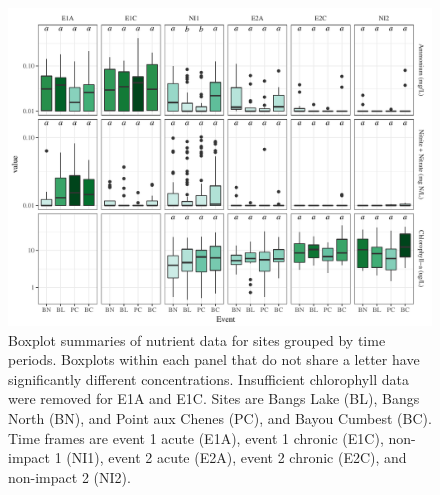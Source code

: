 \documentclass[letterpaper,12pt]{article}\usepackage[]{graphicx}\usepackage[]{color}
\makeatletter
\def\maxwidth{ %
  \ifdim\Gin@nat@width>\linewidth
    \linewidth
  \else
    \Gin@nat@width
  \fi
}
\makeatother
\begin{document}
\begin{figure}[!ht]

{\centering \includegraphics[width=\maxwidth]{figs/FigS2} 

}

\caption[Boxplot summaries of nutrient data for sites grouped by time periods]{Boxplot summaries of nutrient data for sites grouped by time periods. Boxplots within each panel that do not share a letter have significantly different concentrations. Insufficient chlorophyll data were removed for E1A and E1C. Sites are Bangs Lake (BL), Bangs North (BN), and Point aux Chenes (PC), and Bayou Cumbest (BC).  Time frames are event 1 acute (E1A), event 1 chronic (E1C), non-impact 1 (NI1), event 2 acute (E2A), event 2 chronic (E2C), and non-impact 2 (NI2).}\label{fig:FigS2}
\end{figure}
\end{document}

